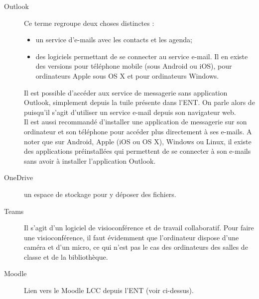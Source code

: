 \documentclass[10pt,a4paper]{report}
\begin{document}
\begin{description}
	\item[Outlook] Ce terme regroupe deux choses distinctes :
		\begin{itemize}
			\item un service d'e-mails avec les contacts et les agenda;
			\item des logiciels permettant de se connecter au service e-mail. Il en existe des versions pour téléphone mobile (sous Android ou iOS), pour ordinateurs Apple sous OS X et pour ordinateurs Windows.
		\end{itemize}
		Il est possible d'accéder aux service de messagerie sans application Outlook, simplement depuis la tuile présente dans l'ENT. On parle alors de  puisqu'il s'agit d'utiliser un service e-mail depuis son navigateur web. \\
		Il est aussi recommandé d'installer une application de messagerie sur son ordinateur et son téléphone pour accéder plus directement à ses e-mails. A noter que sur Android, Apple (iOS ou OS X), Windows ou Linux, il existe des applications préinstallées qui permettent de se connecter à son e-mails sans avoir à installer l'application Outlook.
	\item[OneDrive] un espace de stockage pour y déposer des fichiers.
	\item[Teams] Il s'agit d'un logiciel de visioconférence et de travail collaboratif. Pour faire une visioconférence, il faut évidemment que l'ordinateur dispose d'une caméra et d'un micro, ce qui n'est pas le cas des ordinateurs des salles de classe et de la bibliothèque.
	\item[Moodle] Lien vers le Moodle LCC depuis l'ENT (voir ci-dessus).
\end{description}


\end{document}
